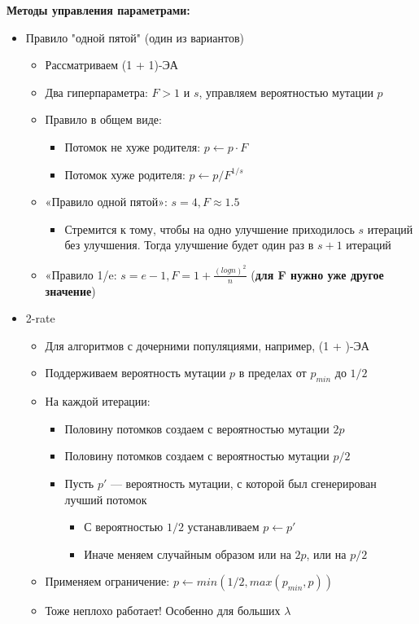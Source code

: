 \textbf{Методы управления параметрами:}
\begin{itemize}
    \item Правило "одной пятой" (один из вариантов)
    \begin{itemize}
        \item Рассматриваем (1 + 1)-ЭА
        \item Два гиперпараметра: $F > 1$ и $s$, управляем вероятностью мутации $p$
        \item Правило в общем виде:
        \begin{itemize}
            \item Потомок не хуже родителя: $p ← p · F$ 
            \item Потомок хуже родителя: $p ← p/F^{1/s}$
        \end{itemize}
        \item «Правило одной пятой»: $s= 4, F \approx 1.5$
        \begin{itemize}
            \item Стремится к тому, чтобы на одно улучшение приходилось $s$ итераций без улучшения. Тогда улучшение будет один раз в $s + 1$ итераций
        \end{itemize}
        \item «Правило 1/e: $s= e-1, F = 1 + \frac{(logn)^2}{n}$ (\textbf{для F нужно уже другое значение})
    \end{itemize}
    \item 2-rate
    \begin{itemize}
        \item Для алгоритмов с дочерними популяциями, например, (1 + \lambda)-ЭА 
        \item Поддерживаем вероятность мутации $p$ в пределах от $p_{min}$ до $1/2$
        \item На каждой итерации:
        \begin{itemize}
            \item Половину потомков создаем с вероятностью мутации $2p$
            \item Половину потомков создаем с вероятностью мутации $p/2$
            \item Пусть $p′$ — вероятность мутации, с которой был сгенерирован лучший потомок
            \begin{itemize}
                \item С вероятностью $1/2$ устанавливаем $p ← p′$
                \item Иначе меняем случайным образом или на $2p$, или на $p/2$
            \end{itemize}
        \end{itemize}
        \item Применяем ограничение: $p ← min(1/2, max(p_{min}, p ))$
        \item Тоже неплохо работает! Особенно для больших $\lambda$    
    \end{itemize}
\end{itemize}


